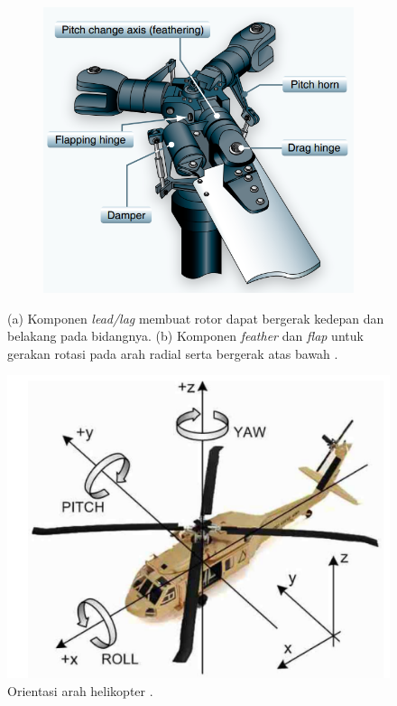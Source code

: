 \begin{figure}[H]
\begin{subfigure}{0.17\textwidth}
		\caption{}
		\label{fig:lead/lag}
	\end{subfigure}
	\centering
	\begin{subfigure}{0.4\textwidth}
		\centering
		\includegraphics[width=\linewidth]{gambar/feather_flap.png}
		\caption{}
		\label{fig:featherflap}
	\end{subfigure}
	\caption{(a) Komponen \textit{lead/lag} membuat rotor dapat bergerak kedepan dan belakang pada bidangnya. (b) Komponen \textit{feather} dan \textit{flap} untuk gerakan rotasi pada arah radial serta bergerak atas bawah \cite{handbook}.}
	\label{fig:fullyarticulated}
\end{figure}

\begin{figure}[H]
	\centering
	\includegraphics[width=0.68\linewidth]{gambar/roll-pitch-yaw.png}
	\caption{Orientasi arah helikopter \cite{Jhwang}.}
	\label{fig:orientasiheli}
\end{figure}

